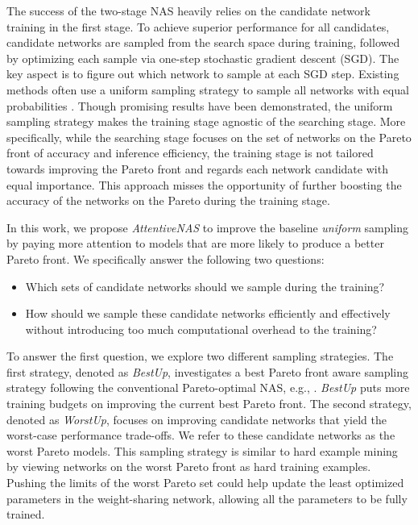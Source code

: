 \documentclass[final]{cvpr}
\theoremstyle{definition}
\begin{document}
The success of the two-stage NAS heavily relies on the candidate network training in the first stage. To achieve superior performance for all candidates, candidate networks are sampled from the search space during training, followed by optimizing each sample via one-step stochastic gradient descent (SGD). The key aspect is to figure out which network to sample at each SGD step. Existing methods often use a uniform sampling strategy to sample all networks with equal probabilities \cite{yu2020bignas, chu2019fairnas, guo2020single, wang2020hat}. Though promising results have been demonstrated, the uniform sampling strategy makes the training stage agnostic of the searching stage. 
More specifically, while the searching stage focuses on the set of networks on the Pareto front of accuracy and inference efficiency, the training stage is not tailored towards improving the Pareto front and regards each network candidate with equal importance. This approach misses the opportunity of further boosting the accuracy of the networks on the Pareto during the training stage.


In this work, we propose \emph{AttentiveNAS} to improve the baseline \textit{uniform} sampling by paying more attention to models that are more likely to produce a better Pareto front. We specifically answer the following two questions:
\begin{itemize}
    \item Which sets of candidate networks should we sample during the training?
    \item How should we sample these candidate networks efficiently and effectively without introducing too much computational overhead to the training?
\end{itemize}
To answer the first question, we explore two different sampling strategies. The first strategy, denoted as \textit{BestUp}, investigates a best Pareto front aware sampling strategy following the conventional Pareto-optimal NAS, e.g., \cite{liu2018darts, cai2018proxylessnas, cheng2018searching, chin2020pareco}.
\textit{BestUp} puts more training budgets on improving the current best Pareto front.
The second strategy, denoted as \textit{WorstUp}, 
focuses on improving candidate networks that yield the worst-case performance trade-offs.
We refer to these candidate networks as the worst Pareto models. 
This sampling strategy is similar to hard example mining \cite{smirnov2018hard, gong2020maxup} by viewing networks on the worst Pareto front as hard training examples. Pushing the limits of the worst Pareto set could help update the least optimized parameters in the weight-sharing network, allowing all the parameters to be fully trained.
\end{document}
